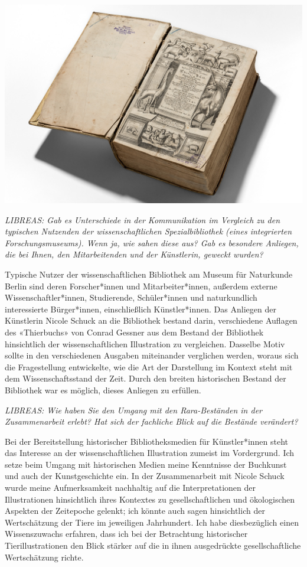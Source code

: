 \documentclass[a4paper,
fontsize=11pt,
oneside,
numbers=noperiodatend,
parskip=half-,
bibliography=totoc,
final
]{scrartcl}
\begin{document}
\begin{center}
\includegraphics{img/image2.jpg}
\end{center}

\emph{LIBREAS: Gab es Unterschiede in der Kommunikation im Vergleich zu
den typischen Nutzenden der wissenschaftlichen Spezialbibliothek (eines
integrierten Forschungsmuseums). Wenn ja, wie sahen diese aus? Gab es
besondere Anliegen, die bei Ihnen, den Mitarbeitenden und der
Künstlerin, geweckt wurden?}

Typische Nutzer der wissenschaftlichen Bibliothek am Museum für
Naturkunde Berlin sind deren Forscher*innen und Mitarbeiter*innen,
außerdem externe Wissenschaftler*innen, Studierende, Schüler*innen und
naturkundlich interessierte Bürger*innen, einschließlich Künstler*innen.
Das Anliegen der Künstlerin Nicole Schuck an die Bibliothek bestand
darin, verschiedene Auflagen des «Thierbuchs» von Conrad Gessner aus dem
Bestand der Bibliothek hinsichtlich der wissenschaftlichen Illustration
zu vergleichen. Dasselbe Motiv sollte in den verschiedenen Ausgaben
miteinander verglichen werden, woraus sich die Fragestellung
entwickelte, wie die Art der Darstellung im Kontext steht mit dem
Wissenschaftsstand der Zeit. Durch den breiten historischen Bestand der
Bibliothek war es möglich, dieses Anliegen zu erfüllen.

\emph{LIBREAS: Wie haben Sie den Umgang mit den Rara-Beständen in der
Zusammenarbeit erlebt? Hat sich der fachliche Blick auf die Bestände
verändert?}

Bei der Bereitstellung historischer Bibliotheksmedien für Künstler*innen
steht das Interesse an der wissenschaftlichen Illustration zumeist im
Vordergrund. Ich setze beim Umgang mit historischen Medien meine
Kenntnisse der Buchkunst und auch der Kunstgeschichte ein. In der
Zusammenarbeit mit Nicole Schuck wurde meine Aufmerksamkeit nachhaltig
auf die Interpretationen der Illustrationen hinsichtlich ihres Kontextes
zu gesellschaftlichen und ökologischen Aspekten der Zeitepoche gelenkt;
ich könnte auch sagen hinsichtlich der Wertschätzung der Tiere im
jeweiligen Jahrhundert. Ich habe diesbezüglich einen Wissenszuwachs
erfahren, dass ich bei der Betrachtung historischer Tierillustrationen
den Blick stärker auf die in ihnen ausgedrückte gesellschaftliche
Wertschätzung richte.
\end{document}
